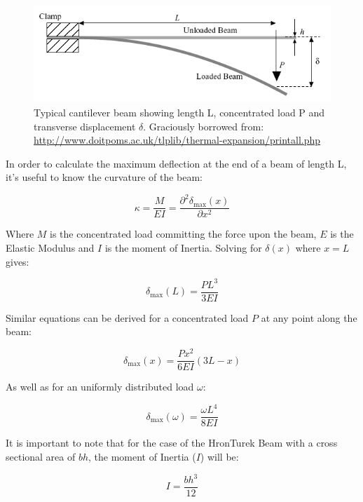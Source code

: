 \begin{figure}[h]
\centering
\includegraphics[width=0.7\linewidth]{../Figures/cantilever.png}
\caption{Typical cantilever beam showing length L, concentrated load P and transverse displacement $ \delta $. Graciously borrowed from: \url{http://www.doitpoms.ac.uk/tlplib/thermal-expansion/printall.php}}
\label{fig:cantilever}
\end{figure}


In order to calculate the maximum deflection at the end of a beam of length L, it's useful to know the curvature of the beam:

\begin{equation}\tag{7.1}
\kappa = \frac{M}{EI} = \frac{\partial^2 \delta_{\text{max}}(x)}{\partial x^2}
\end{equation}

Where $ M $ is the concentrated load committing the force upon the beam, $ E $ is the Elastic Modulus and $ I $ is the moment of Inertia.
Solving for $ \delta(x) $ where $ x = L $ gives:

\begin{equation}\tag{7.2}
\delta_{\text{max}}(L) = \frac{PL^3}{3EI}
\end{equation}

Similar equations can be derived for a concentrated load $ P $ at any point along the beam: 

\begin{equation}\tag{7.3}
\delta_{\text{max}}(x) = \frac{Px^2}{6EI}(3L - x)
\end{equation}

As well as for an uniformly distributed load $ \omega $: 

\begin{equation}\tag{7.4}
\delta_{\text{max}}(\omega) = \frac{\omega L^4}{8EI}
\end{equation}

It is important to note that for the case of the HronTurek Beam with a cross sectional area of $ bh $, the moment of Inertia ($ I $) will be:

\begin{equation}\tag{7.5}
I = \frac{bh^3}{12}
\end{equation}

